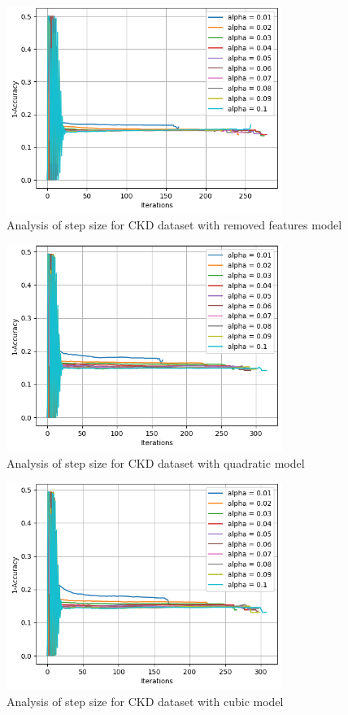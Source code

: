 \documentclass{article}
\begin{document}
\begin{figure}[H]
  \centering
  \includegraphics[width=0.8\textwidth]{CKDmodel3.png}
  \caption{Analysis of step size for CKD dataset with removed features model}
  \label{fig:quad_ckd}
\end{figure}

\begin{figure}[H]
  \centering
  \includegraphics[width=0.8\textwidth]{CKDmodel4.png}
  \caption{Analysis of step size for CKD dataset with quadratic model}
  \label{fig:quad_ckd}
\end{figure}

\begin{figure}[H]
  \centering
  \includegraphics[width=0.8\textwidth]{CKDmodel5.png}
  \caption{Analysis of step size for CKD dataset with cubic model }
  \label{fig:quad_ckd}
\end{figure}
\end{document}

